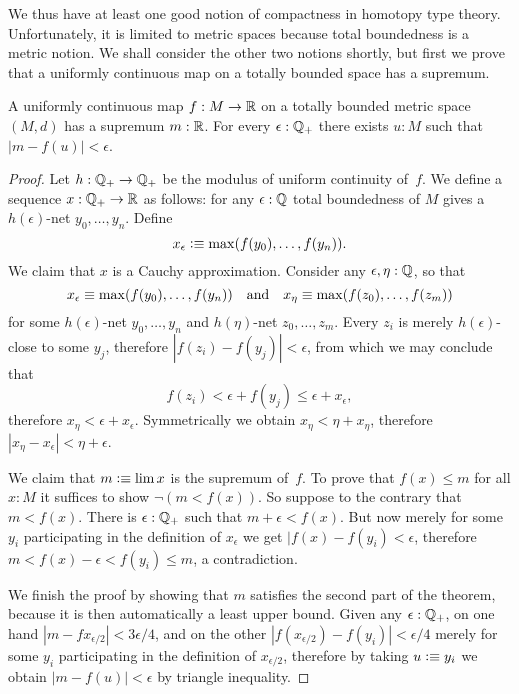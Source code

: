 We thus have at least one good notion of compactness in homotopy type theory.
Unfortunately, it is limited to metric spaces because total boundedness is a metric
notion. We shall consider the other two notions shortly, but first we prove that a
uniformly continuous map on a totally bounded space has a supremum.

\begin{thm} \label{ctb-uniformly-continuous-sup}
  A uniformly continuous map $f : M \to \mathbb{R}$ on a totally bounded metric space
  $(M, d)$ has a supremum $m : \mathbb{R}$. For every $\epsilon : \mathbb{Q}_{+}$ there exists $u : M$ such
  that $|m - f(u)| < \epsilon$.
\end{thm}

\begin{proof}
  Let $h : \mathbb{Q}_{+} \to \mathbb{Q}_{+}$ be the modulus of uniform continuity of~$f$.
  We define a sequence $x : \mathbb{Q}_{+} \to \mathbb{R}$ as follows: for any $\epsilon : \mathbb{Q}$ total
  boundedness of $M$ gives a $h(\epsilon)$-net $y_0, \ldots, y_n$. Define
  \begin{equation*}
    x_\epsilon \vcentcolon\equiv \max (f(y_0), \ldots, f(y_n)).
  \end{equation*}
  We claim that $x$ is a Cauchy approximation. Consider any $\epsilon, \eta : \mathbb{Q}$, so that
  \begin{equation*}
    x_\epsilon \equiv \max (f(y_0), \ldots, f(y_n))
    \quad\text{and}\quad
    x_\eta \equiv \max (f(z_0), \ldots, f(z_m))
  \end{equation*}
  for some $h(\epsilon)$-net $y_0, \ldots, y_n$ and $h(\eta)$-net $z_0, \ldots, z_m$.
  Every $z_i$ is merely $h(\epsilon)$-close to some $y_j$, therefore $|f(z_i) - f(y_j)| <
  \epsilon$, from which we may conclude that
  \begin{equation*}
    f(z_i) < \epsilon + f(y_j) \leq \epsilon + x_\epsilon,
  \end{equation*}
  therefore $x_\eta < \epsilon + x_\epsilon$. Symmetrically we obtain $x_\eta < \eta +
  x_\eta$, therefore $|x_\eta - x_\epsilon| < \eta + \epsilon$.

  We claim that $m \vcentcolon\equiv \lim x$ is the supremum of~$f$. To prove that $f(x) \leq m$ for
  all $x : M$ it suffices to show $\lnot (m < f(x))$. So suppose to the contrary that $m <
  f(x)$. There is $\epsilon : \mathbb{Q}_{+}$ such that $m + \epsilon < f(x)$. But now merely for
  some $y_i$ participating in the definition of $x_\epsilon$ we get $|f(x) - f(y_i) <
  \epsilon$, therefore $m < f(x) - \epsilon < f(y_i) \leq m$, a contradiction.

  We finish the proof by showing that $m$ satisfies the second part of the theorem, because
  it is then automatically a least upper bound. Given any $\epsilon : \mathbb{Q}_{+}$, on one hand
  $|m - fx_{\epsilon/2}| < 3 \epsilon/4$, and on the other $|f(x_{\epsilon/2}) - f(y_i)| <
  \epsilon/4$ merely for some $y_i$ participating in the definition of $x_{\epsilon/2}$,
  therefore by taking $u \vcentcolon\equiv y_i$ we obtain $|m - f(u)| < \epsilon$ by triangle
  inequality.
\end{proof}

